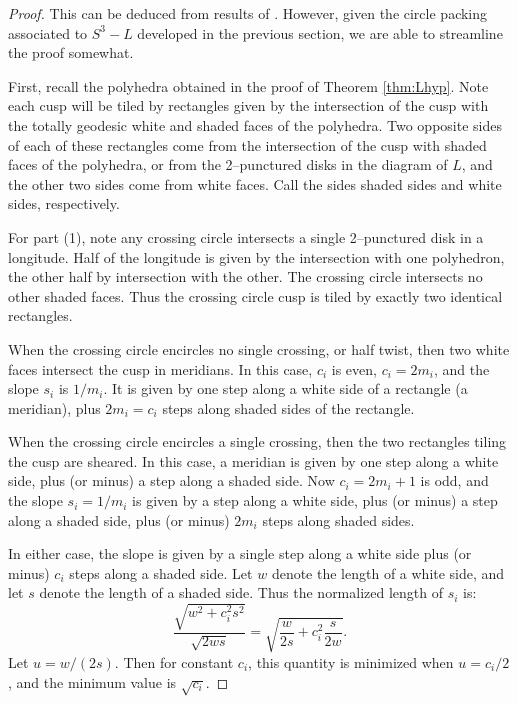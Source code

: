 \begin{proof}
  This can be deduced from results of \cite{futer-purcell}.  However,
  given the circle packing associated to $S^3-L$ developed in the
  previous section, we are able to streamline the proof somewhat.
  
  First, recall the polyhedra obtained in the proof of Theorem
  \ref{thm:Lhyp}.  Note each cusp will be tiled by rectangles given by
  the intersection of the cusp with the totally geodesic white and
  shaded faces of the polyhedra.  Two opposite sides of each of these
  rectangles come from the intersection of the cusp with shaded faces
  of the polyhedra, or from the 2--punctured disks in the diagram of
  $L$, and the other two sides come from white faces.  Call the sides
  shaded sides and white sides, respectively.  
  
  For part (1), note any crossing circle intersects a single
  2--punctured disk in a longitude.  Half of the longitude is given by
  the intersection with one polyhedron, the other half by intersection
  with the other.  The crossing circle intersects no other shaded
  faces.  Thus the crossing circle cusp is tiled by exactly two
  identical rectangles.
  
  When the crossing circle encircles no single crossing, or half twist,
  then two white faces intersect the cusp in meridians.  In this case,
  $c_i$ is even, $c_i=2m_i$, and the slope $s_i$ is $1/m_i$.  It is
  given by one step along a white side of a rectangle (a meridian),
  plus $2m_i=c_i$ steps along shaded sides of the rectangle.
  
  When the crossing circle encircles a single crossing, then the two
  rectangles tiling the cusp are sheared.  In this case, a meridian is
  given by one step along a white side, plus (or minus) a step along a
  shaded side.  Now $c_i =2m_i+1$ is odd, and the slope $s_i =1/m_i$
  is given by a step along a white side, plus (or minus) a step along
  a shaded side, plus (or minus) $2m_i$ steps along shaded sides.
  
  In either case, the slope is given by a single step along a white
  side plus (or minus) $c_i$ steps along a shaded side.  Let $w$
  denote the length of a white side, and let $s$ denote the length of
  a shaded side.  Thus the normalized length of $s_i$ is:
  $$\frac{\sqrt{w^2+c_i^2s^2}}{\sqrt{2ws}} =
  \sqrt{\frac{w}{2s}+c_i^2\frac{s}{2w}}.$$
  Let $u=w/(2s)$.  Then for
  constant $c_i$, this quantity is minimized when $u=c_i/2$, and the
  minimum value is $\sqrt{c_i}$.
  

\end{proof}
